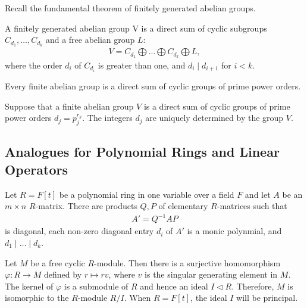 \documentclass{memoir}
\begin{document}


Recall the fundamental theorem of finitely generated abelian groups.

\begin{thm}
	A finitely generated abelian group V is a direct sum of cyclic subgroups \(C_{d_1},\ldots,C_{d_k}\) and a free abelian group \(L\):
	\begin{align*}
		V = C_{d_1}\bigoplus \ldots \bigoplus C_{d_k}\bigoplus L,
	\end{align*}
	where the order \(d_i\) of \(C_{d_i}\) is greater than one, and \(d_i \mid d_{i+1}\) for \(i<k\).
\end{thm}

\begin{thm}
	Every finite abelian group is a direct sum of cyclic groups of prime power orders.
\end{thm}
\begin{thm}
	Suppose that a finite abelian group \(V\) is a direct sum of cyclic groups of prime power orders \(d_j = p_j^{r_k}\). The integers \(d_j\) are uniquely determined by the group \(V\).
\end{thm}

\subsection{Analogues for Polynomial Rings and Linear Operators}
\label{sub:analogues_for_polynomial_rings_and_linear_operators}

\begin{thm}
	Let \(R = F[t]\) be a polynomial ring in one variable over a field \(F\) and let \(A\) be an \(m\times n\) \(R\)-matrix. There are products \(Q,P\) of elementary \(R\)-matrices such that
	\begin{align*}
		A' = Q^{-1}AP
	\end{align*}
	is diagonal, each non-zero diagonal entry \(d_i\) of \(A'\) is a monic polynmial, and \(d_1\mid \ldots\mid d_k\).
\end{thm}

\begin{rmrk}
Let \(M\) be a free cyclic \(R\)-module. Then there is a surjective homomorphism \(\varphi:R\to M\) defined by \(r\mapsto rv\), where \(v\) is the singular generating element in \(M\). The kernel of \(\varphi\) is a submodule of \(R\) and hence an ideal \(I \triangleleft R\). Therefore, \(M\) is isomorphic to the \(R\)-module \(R / I\). When \(R = F[t]\), the ideal \(I\) will be principal.
\end{rmrk}
\end{document}
